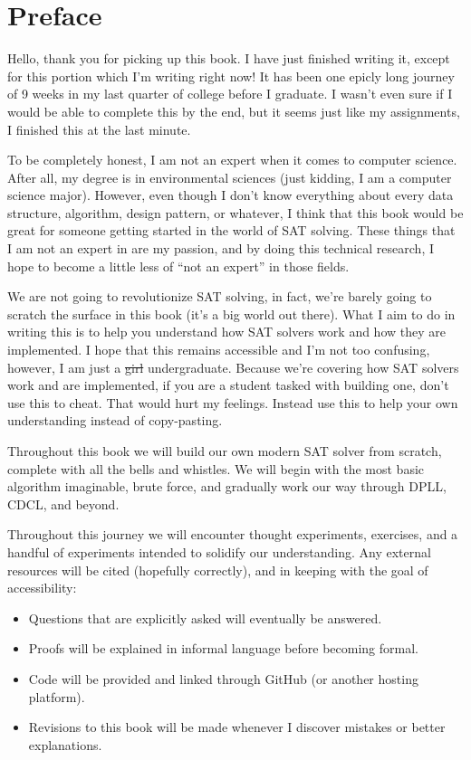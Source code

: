 \chapter*{Preface}

Hello, thank you for picking up this book. I have just finished writing it, except for this 
portion which I'm writing right now! It has been one epicly long journey of 9 weeks in my 
last quarter of college before I graduate. I wasn't even sure if I would be able to complete 
this by the end, but it seems just like my assignments, I finished this at the last minute.

To be completely honest, I am not an expert when it comes to computer science. After all, 
my degree is in environmental sciences (just kidding, I am a computer science major).
However, even though I don't know everything about every data structure, algorithm, 
design pattern, or whatever, I think that this book would be great for someone getting 
started in the world of SAT solving. These things that I am not an expert in are my passion,
and by doing this technical research, I hope to become a little less of ``not an expert'' in 
those fields.

We are not going to revolutionize SAT solving, in fact, we're barely going to scratch the 
surface in this book (it's a big world out there). What I aim to do in writing this is to 
help you understand how SAT solvers work and how they are implemented. I hope that this 
remains accessible and I'm not too confusing, however, I am just a \sout{girl} undergraduate.
Because we're covering how SAT solvers work and are implemented, if you are a student tasked 
with building one, don't use this to cheat. That would hurt my feelings. Instead use this to 
help your own understanding instead of copy-pasting.

Throughout this book we will build our own modern SAT solver from scratch, 
complete with all the bells and whistles. We will begin with the most basic 
algorithm imaginable, brute force, and gradually work our way through DPLL, CDCL, 
and beyond.

Throughout this journey we will encounter thought experiments, exercises, and a
handful of experiments intended to solidify our understanding. Any external resources will 
be cited (hopefully correctly), and in keeping with the goal of accessibility:
\begin{itemize}
    \item Questions that are explicitly asked will eventually be answered.
    \item Proofs will be explained in informal language before becoming formal.
    \item Code will be provided and linked through GitHub (or another hosting platform).
    \item Revisions to this book will be made whenever I discover mistakes or better explanations.
\end{itemize}

